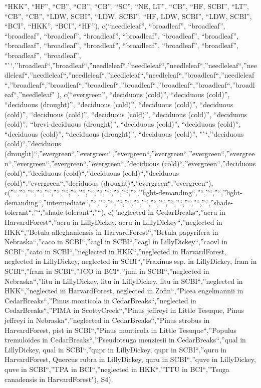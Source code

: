 \documentclass[
]{article}
\begin{document}
``HKK'', ``HF'', ``CB'', ``CB'', ``CB'', ``SC'', ``NE, LT'', ``CB'',
``HF, SCBI'', ``LT'', ``CB'', ``CB'', ``LDW, SCBI'', ``LDW, SCBI'',
``HF, LDW, SCBI'', ``LDW, SCBI'', ``BCI'', ``HKK'', ``BCI'', ``HF''),
c(``needleleaf'', ``broadleaf'', ``broadleaf'', ``broadleaf'',
``broadleaf'', ``broadleaf'', ``broadleaf'', ``broadleaf'',
``broadleaf'', ``broadleaf'', ``broadleaf'', ``broadleaf'',
``broadleaf'', ``broadleaf'', ``broadleaf'', ``broadleaf'',
``broadleaf'',
"``,''broadleaf``,''broadleaf``,''needleleaf``,''needleleaf``,''needleleaf``,''needleleaf``,''needleleaf``,''needleleaf``,''needleleaf``,''needleleaf``,''needleleaf``,''broadleaf``,''needleleaf``,''broadleaf``,''broadleaf``,''broadleaf``,''broadleaf``,''broadleaf``,''broadleaf``,''broadleaf``,''needleleaf"
), c(``evergreen'', ``deciduous (cold)'', ``deciduous (cold)'',
``deciduous (drought)'', ``deciduous (cold)'', ``deciduous (cold)'',
``deciduous (cold)'', ``deciduous (cold)'', ``deciduous (cold)'',
``deciduous (cold)'', ``deciduous (cold)'', ``brevi-deciduous
(drought)'', ``deciduous (cold)'', ``deciduous (cold)'', ``deciduous
(cold)'', ``deciduous (drought)'', ``deciduous (cold)'', "``,''deciduous
(cold)``,''deciduous
(drought)``,''evergreen``,''evergreen``,''evergreen``,''evergreen``,''evergreen``,''evergreen``,''evergreen``,''evergreen``,''evergreen``,''deciduous
(cold)``,''evergreen``,''deciduous (cold)``,''deciduous
(cold)``,''deciduous (cold)``,''deciduous
(cold)``,''evergreen``,''deciduous
(drought)``,''evergreen``,''evergreen``),
c(''``,''``,''``,''``,''``,''``,''``,''``,''``,''``,''``,''``,''``,''``,''``,''light-demanding``,''``,''``,''``,''light-demanding``,''intermediate``,''``,''``,''``,''``,''``,''``,''``,''``,''``,''``,''``,''``,''``,''``,''shade-tolerant``,''``,''shade-tolerant``,''``),
c(''neglected in CedarBreaks``,''acru in HarvardForest``,''acru in
LillyDickey, acru in LillyDickey``,''neglected in HKK``,''Betula
alleghaniensis in HarvardForest``,''Betula papyrifera in
Nebraska``,''caco in SCBI``,''cagl in SCBI``,''cagl in
LillyDickey``,''caovl in SCBI``,''cato in SCBI``,''neglected in
HKK``,''neglected in HarvardForest, neglected in LillyDickey, neglected
in SCBI``,''Fraxinus ssp. in LillyDickey, fram in SCBI``,''fram in
SCBI``,''JCO in BCI``,''juni in SCBI``,''neglected in Nebraska``,''litu
in LillyDickey, litu in LillyDickey, litu in SCBI``,''neglected in
HKK``,''neglected in HarvardForest, neglected in Zofin``,''Picea
engelmannii in CedarBreaks``,''Pinus monticola in
CedarBreaks``,''neglected in CedarBreaks``,''PIMA in
ScottyCreek``,''Pinus jeffreyi in Little Tesuque, Pinus jeffreyi in
Nebraska``,''neglected in CedarBreaks``,''Pinus strobus in
HarvardForest, pist in SCBI``,''Pinus monticola in Little
Tesuque``,''Populus tremuloides in CedarBreaks``,''Pseudotsuga menziesii
in CedarBreaks``,''qual in LillyDickey, qual in SCBI``,''qupr in
LillyDickey, qupr in SCBI``,''quru in HarvardForest, Quercus rubra in
LillyDickey, quru in SCBI``,''quve in LillyDickey, quve in SCBI``,''TPA
in BCI``,''neglected in HKK``,''TTU in BCI``,''Tsuga canadensis in
HarvardForest"), S4).
\end{document}

